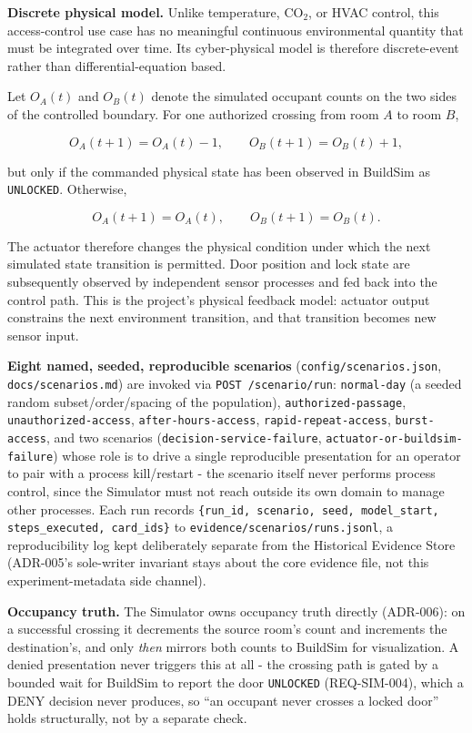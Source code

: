 \documentclass[11pt]{article}
\begin{document}
\textbf{Discrete physical model.} Unlike temperature, CO$_2$, or HVAC
control, this access-control use case has no meaningful continuous
environmental quantity that must be integrated over time. Its
cyber-physical model is therefore discrete-event rather than
differential-equation based.

Let \(O_A(t)\) and \(O_B(t)\) denote the simulated occupant counts on the
two sides of the controlled boundary. For one authorized crossing from
room \(A\) to room \(B\),

\[
O_A(t+1) = O_A(t) - 1,
\qquad
O_B(t+1) = O_B(t) + 1,
\]

but only if the commanded physical state has been observed in BuildSim
as \texttt{UNLOCKED}. Otherwise,

\[
O_A(t+1) = O_A(t),
\qquad
O_B(t+1) = O_B(t).
\]

The actuator therefore changes the physical condition under which the
next simulated state transition is permitted. Door position and lock
state are subsequently observed by independent sensor processes and fed
back into the control path. This is the project's physical feedback
model: actuator output constrains the next environment transition, and
that transition becomes new sensor input.

\textbf{Eight named, seeded, reproducible scenarios}
(\texttt{config/scenarios.json}, \texttt{docs/scenarios.md}) are invoked
via \texttt{POST /scenario/run}: \texttt{normal-day} (a seeded random
subset/order/spacing of the population), \texttt{authorized-passage},
\texttt{unauthorized-access}, \texttt{after-hours-access},
\texttt{rapid-repeat-access}, \texttt{burst-access}, and two scenarios
(\texttt{decision-service-failure}, \texttt{actuator-or-buildsim-failure})
whose role is to drive a single reproducible presentation for an operator
to pair with a process kill/restart - the scenario itself never performs
process control, since the Simulator must not reach outside its own
domain to manage other processes. Each run records
\texttt{\{run\_id, scenario, seed, model\_start, steps\_executed,
card\_ids\}} to \texttt{evidence/scenarios/runs.jsonl}, a reproducibility
log kept deliberately separate from the Historical Evidence Store
(ADR-005's sole-writer invariant stays about the core evidence file, not
this experiment-metadata side channel).

\textbf{Occupancy truth.} The Simulator owns occupancy truth directly
(ADR-006): on a successful crossing it decrements the source room's
count and increments the destination's, and only \emph{then} mirrors both
counts to BuildSim for visualization. A denied presentation never
triggers this at all - the crossing path is gated by a bounded wait for
BuildSim to report the door \texttt{UNLOCKED} (REQ-SIM-004), which a DENY
decision never produces, so ``an occupant never crosses a locked door''
holds structurally, not by a separate check.
\end{document}
